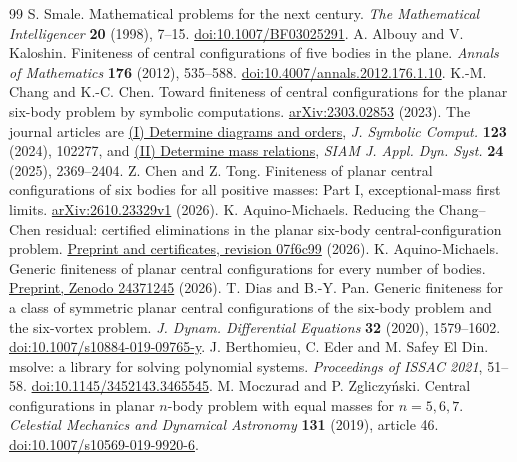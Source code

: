 \documentclass[11pt,letterpaper]{article}
\theoremstyle{definition}
\begin{document}
\begin{thebibliography}{99}\small\setlength{\itemsep}{1pt}
 S. Smale. Mathematical problems for the next century. \emph{The Mathematical Intelligencer} \textbf{20} (1998), 7--15. \href{https://doi.org/10.1007/BF03025291}{doi:10.1007/BF03025291}.
 A. Albouy and V. Kaloshin. Finiteness of central configurations of five bodies in the plane. \emph{Annals of Mathematics} \textbf{176} (2012), 535--588. \href{https://doi.org/10.4007/annals.2012.176.1.10}{doi:10.4007/annals.2012.176.1.10}.
 K.-M. Chang and K.-C. Chen. Toward finiteness of central configurations for the planar six-body problem by symbolic computations. \href{https://arxiv.org/abs/2303.02853}{arXiv:2303.02853} (2023). The journal articles are \href{https://doi.org/10.1016/j.jsc.2023.102277}{(I) Determine diagrams and orders}, \emph{J. Symbolic Comput.} \textbf{123} (2024), 102277, and \href{https://doi.org/10.1137/24M1716070}{(II) Determine mass relations}, \emph{SIAM J. Appl. Dyn. Syst.} \textbf{24} (2025), 2369--2404.
 Z. Chen and Z. Tong. Finiteness of planar central configurations of six bodies for all positive masses: Part I, exceptional-mass first limits. \href{https://arxiv.org/abs/2610.23329v1}{arXiv:2610.23329v1} (2026).
 K. Aquino-Michaels. Reducing the Chang--Chen residual: certified eliminations in the planar six-body central-configuration problem. \href{https://github.com/no-way-labs/smale6-residual/tree/07f6c99}{Preprint and certificates, revision 07f6c99} (2026).
 K. Aquino-Michaels. Generic finiteness of planar central configurations for every number of bodies. \href{https://doi.org/10.5281/zenodo.24371245}{Preprint, Zenodo 24371245} (2026).
 T. Dias and B.-Y. Pan. Generic finiteness for a class of symmetric planar central configurations of the six-body problem and the six-vortex problem. \emph{J. Dynam. Differential Equations} \textbf{32} (2020), 1579--1602. \href{https://doi.org/10.1007/s10884-019-09765-y}{doi:10.1007/s10884-019-09765-y}.
 J. Berthomieu, C. Eder and M. Safey El Din. msolve: a library for solving polynomial systems. \emph{Proceedings of ISSAC 2021}, 51--58. \href{https://doi.org/10.1145/3452143.3465545}{doi:10.1145/3452143.3465545}.
 M. Moczurad and P. Zgliczy\'nski. Central configurations in planar $n$-body problem with equal masses for $n=5,6,7$. \emph{Celestial Mechanics and Dynamical Astronomy} \textbf{131} (2019), article 46. \href{https://doi.org/10.1007/s10569-019-9920-6}{doi:10.1007/s10569-019-9920-6}.

\end{thebibliography}
\end{document}
